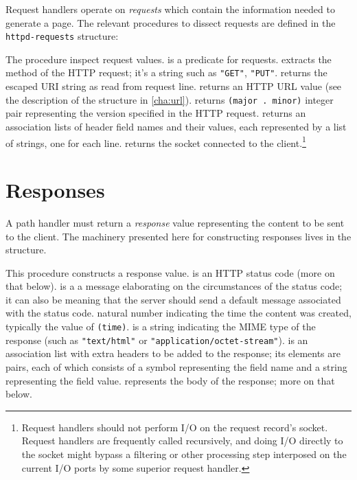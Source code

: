 Request handlers operate on \textit{requests} which contain the
information needed to generate a page.  The relevant procedures to
dissect requests are defined in the \texttt{httpd-requests} structure:

\begin{desc}
  The procedure inspect request values.   is a predicate
  for requests.   extracts the method of the HTTP
  request; it's a string such as \verb|"GET"|, \verb|"PUT"|.
   returns the escaped URI string as read from request
  line.   returns an HTTP URL value (see the
  description of the  structure in \ref{cha:url}).
   returns \verb|(major . minor)| integer pair
  representing the version specified in the HTTP request.
   returns an association lists of header field
  names and their values, each represented by a list of strings, one
  for each line.   returns the socket connected
  to the client.\footnote{Request handlers should not perform I/O on the
    request record's socket.  Request handlers are frequently called
    recursively, and doing I/O directly to the socket might bypass a
    filtering or other processing step interposed on the current I/O ports
    by some superior request handler.}
\end{desc}

\section{Responses}
\label{sec:http-responses}

A path handler must return a \textit{response} value representing the
content to be sent to the client.  The machinery presented here for
constructing responses lives in the  structure.

\begin{desc}
  This procedure constructs a response value.   is an
  HTTP status code (more on that below).   is a a
  message elaborating on the circumstances of the status code; it can
  also be \sharpf{} meaning that the server should send a default
  message associated with the status code.   natural
  number indicating the time the content was created, typically the
  value of \verb|(time)|.   is a string indicating the MIME
  type of the response (such as \verb|"text/html"| or
  \verb|"application/octet-stream"|).   is an association
  list with extra headers to be added to the response; its elements
  are pairs, each of which consists of a symbol representing the field
  name and a string representing the field value.  
  represents the body of the response; more on that below.
\end{desc}

